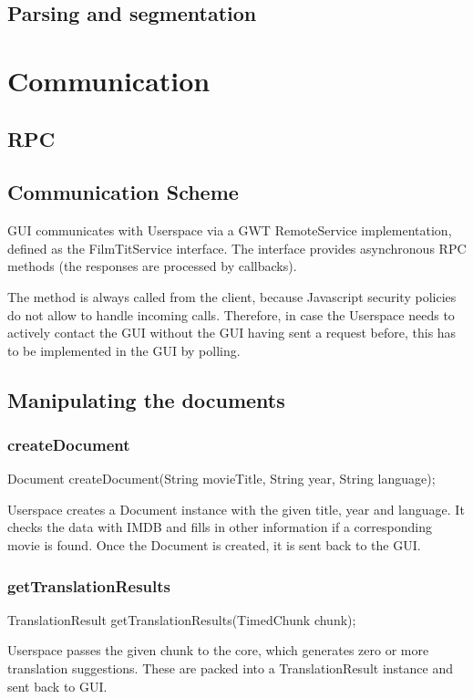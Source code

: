 \subsection{Parsing and segmentation}


\section{Communication}
\label{sec:communication}
\subsection{RPC}

\subsection{Communication Scheme}
GUI communicates with Userspace via a GWT RemoteService implementation, defined as the FilmTitService interface.
The interface provides asynchronous RPC methods (the responses are processed by callbacks).

The method is always called from the client, because Javascript security policies do not allow to handle incoming calls.
Therefore, in case the Userspace needs to actively contact the GUI without the GUI having sent a request before,
this has to be implemented in the GUI by polling.

\subsection{Manipulating the documents}

\subsubsection{createDocument}
	Document createDocument(String movieTitle, String year, String language);

Userspace creates a Document instance with the given title, year and language.
It checks the data with IMDB and fills in other information if a corresponding movie is found.
Once the Document is created, it is sent back to the GUI.

\subsubsection{getTranslationResults}
	TranslationResult getTranslationResults(TimedChunk chunk);
	
Userspace passes the given chunk to the core, which generates zero or more translation suggestions.
These are packed into a TranslationResult instance and sent back to GUI.
	
